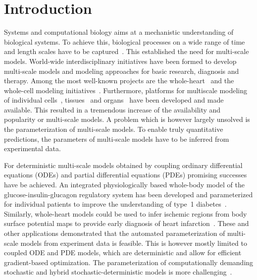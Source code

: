 \documentclass[10pt,letterpaper]{article}
\begin{document}
\linenumbers

\section*{Introduction}

Systems and computational biology aims at a mechanistic understanding of biological systems. To achieve this, biological processes on a wide range of time and length scales have to be captured~\cite{HunterBor2003}. This established the need for multi-scale models. World-wide interdisciplinary initiatives have been formed to develop multi-scale models and modeling approaches for basic research, diagnosis and therapy. Among the most well-known projects are the whole-heart~\cite{HunterBor2003,Nobel2002,Trayanova2011} and the whole-cell modeling initiatives~\cite{TomitaHas1999,KarrSan2012}. Furthermore, platforms for multiscale modeling of individual cells~\cite{StilesBar2001,SchaffFin1997}, tissues~\cite{RichmondWal2010,SwatTho2012,StarrussBac2014} and organs~\cite{MiramsArt2013} have been developed and made available. This resulted in a tremendous increase of the availability and popularity or multi-scale models. A problem which is however largely unsolved is the parameterization of multi-scale models. To enable truly quantitative predictions, the parameters of multi-scale models have to be inferred from experimental data.

For deterministic multi-scale models obtained by coupling ordinary differential equations (ODEs) and partial differential equations (PDEs) promising successes have be achieved. An integrated physiologically based whole-body model of the glucose-insulin-glucagon regulatory system has been developed and parameterized for individual patients to improve the understanding of type~1 diabetes~\cite{SchallerWil2013}. Similarly, whole-heart models could be used to infer ischemic regions from body surface potential maps to provide early diagnosis of heart infarction~\cite{NielsenLys2013}. These and other applications demonstrated that the automated parameterization of multi-scale models from experiment data is feasible. This is however mostly limited to coupled ODE and PDE models, which are deterministic and allow for efficient gradient-based optimization. The parameterization of computationally demanding stochastic and hybrid stochastic-deterministic models is more challenging~\cite{AdraKir2011,KarrWil2015}.
\end{document}
